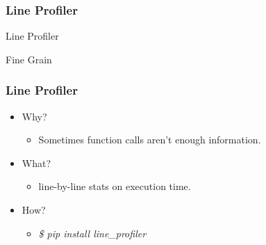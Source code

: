 \documentclass[c,english]{beamer}
\providecommand*{\DUroletitlereference}[1]{\textsl{#1}}
\begin{document}
\begin{frame}[fragile]
\frametitle{Line Profiler}


\begin{block}{ \centering \LARGE Line Profiler }

\centering \Large Fine Grain

\end{block}
\end{frame}

\begin{frame}[fragile]
\frametitle{Line Profiler}

\begin{itemize}

\item Why?
\begin{itemize}

\item Sometimes function calls aren't enough information.
\end{itemize}

\item What?
\begin{itemize}

\item line-by-line stats on execution time.
\end{itemize}

\item How?
\begin{itemize}

\item \DUroletitlereference{\$ pip install line\_profiler}
\end{itemize}
\end{itemize}
\end{frame}
\end{document}
